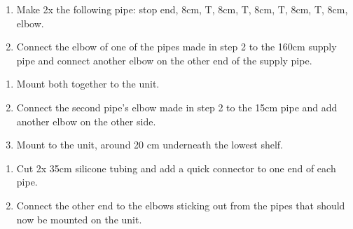 \documentclass[letterpaper,10pt,english]{sphinxmanual}
\begin{document}
\noindent{}
\begin{enumerate}
%
\setcounter{enumi}{1}
\item {} 
Make 2x the following pipe: stop end, 8cm, T, 8cm, T, 8cm, T, 8cm, T, 8cm, elbow.

\item {} 
Connect the elbow of one of the pipes made in step 2 to the 160cm supply pipe and connect another elbow on the other end of the supply pipe.

\end{enumerate}

\noindent{}
\begin{enumerate}
%
\setcounter{enumi}{3}
\item {} 
Mount both together to the unit.

\item {} 
Connect the second pipe’s elbow made in step 2 to the 15cm pipe and add another elbow on the other side.

\item {} 
Mount to the unit, around 20 cm underneath the lowest shelf.

\end{enumerate}

\noindent{}
\begin{enumerate}
%
\setcounter{enumi}{6}
\item {} 
Cut 2x 35cm silicone tubing and add a quick connector to one end of each pipe.

\item {} 
Connect the other end to the elbows sticking out from the pipes that should now be mounted on the unit.

\end{enumerate}



\renewcommand{\indexname}{Index}
\printindex
\end{document}
